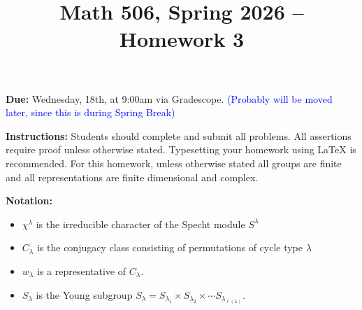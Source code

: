 \documentclass[12pt]{article}
\title{Math 506, Spring 2026 -- Homework 3}
\date{}
\begin{document}
 \maketitle
\vspace{-80pt}

\textbf{Due:} Wednesday, 18th, at 9:00am via Gradescope.
\textcolor{blue}{(Probably will be moved later, since this is during Spring Break)}

\textbf{Instructions:} Students should complete and submit all problems. All assertions require proof unless otherwise stated. Typesetting your homework using LaTeX is recommended. For this homework, unless otherwise stated all groups are finite and all representations are finite dimensional and complex.

\textbf{Notation:}
\begin{itemize}
    \item $\chi^\lambda$ is the irreducible character of the Specht module $S^\lambda$
    \item $C_\lambda$ is the conjugacy class consisting of permutations of cycle type $\lambda$
    \item $w_\lambda$ is a representative of $C_\lambda$.
    \item $S_\lambda$ is the Young subgroup $S_\lambda = S_{\lambda_1}\times S_{\lambda_2}\times\cdots S_{\lambda_{\ell(\lambda)}}$.
\end{itemize}
\end{document}
